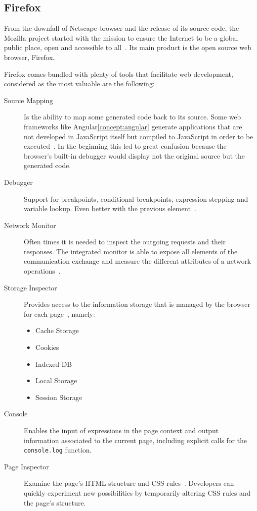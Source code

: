\subsection{Firefox}
From the downfall of Netscape browser and the release of its source code, the Mozilla project started with the mission to ensure the Internet to be a global public place, open and accessible to all~\cite{firemission}. Its main product is the open source web browser, Firefox.

Firefox comes bundled with plenty of tools that facilitate web development, considered as the most valuable are the following:
\begin{description}
\item [Source Mapping] Is the ability to map some generated code back to its source. Some web frameworks like Angular\ref{concept:angular} generate applications that are not developed in JavaScript itself but compiled to JavaScript in order to be executed~\cite{srcmapping}. In the beginning this led to great confusion because the browser's built-in debugger would display not the original source but the generated code.
\item [Debugger] Support for breakpoints, conditional breakpoints, expression stepping and variable lookup. Even better with the previous element~\cite{dbgmodernweb}.
\item [Network Monitor] Often times it is needed to inspect the outgoing requests and their responses. The integrated monitor is able to expose all elements of the communication exchange and measure the different attributes of a network operations~\cite{networkmon}.
\item [Storage Inspector] Provides access to the information storage that is managed by the browser for each page~\cite{storageinspector}, namely:
  \begin{itemize}
  \item Cache Storage
  \item Cookies
  \item Indexed \gls{DB}
  \item Local Storage
  \item Session Storage
  \end{itemize}
\item [Console] Enables the input of expressions in the page context and output information associated to the current page, including explicit calls for the \texttt{console.log} function.
\item [Page Inspector] Examine the page's \gls{HTML} structure and \gls{CSS} rules~\cite{inspector}. Developers can quickly experiment new possibilities by temporarily altering \gls{CSS} rules and the page's structure.
\end{description}

